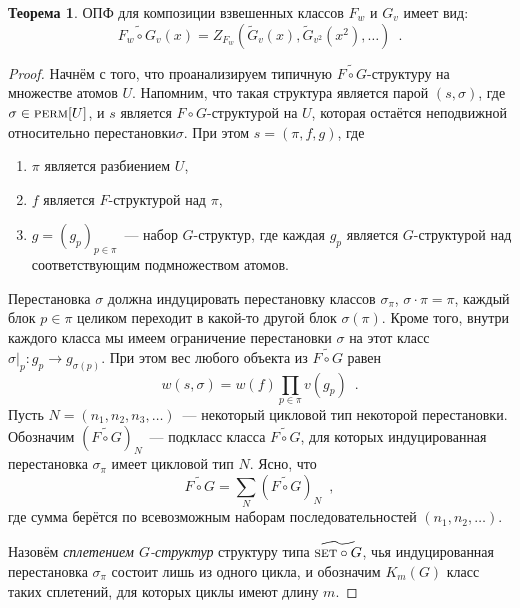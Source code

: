 \documentclass[a5paper]{article}
\theoremstyle{definition}
\newtheorem*{theorem}{Теорема}
\begin{document}
\begin{theorem}
    ОПФ для композиции взвешенных классов \( F_w \) и \( G_v \) имеет вид:
\[
    \widetilde{F_w \circ G_v}(x) = Z_{F_w}
    (\widetilde G_v(x), \widetilde G_{v^2}(x^2), \ldots)
    \enspace.
\] 
\end{theorem}
\begin{proof}
    Начнём с того, что проанализируем типичную \( \widetilde{F \circ G}
\)-структуру на множестве атомов \( U \). Напомним, что такая структура является
парой \( (s, \sigma) \), где \( \sigma \in \text{\textsc{perm}}[U] \), и \( s \)
является \( F \circ G \)-структурой на \( U \), которая остаётся неподвижной
относительно перестановки\( \sigma \). При этом \( s = ( \pi, f, g ) \), где
\begin{enumerate}
\item \( \pi \) является разбиением \( U \),
\item \( f \) является \( F \)-структурой над \( \pi \),
\item \( g= (g_p)_{p \in \pi} \)~--- набор \( G \)-структур, где каждая \( g_p
\) является \( G\)-структурой над соответствующим подмножеством атомов.
\end{enumerate}
Перестановка \( \sigma \) должна индуцировать перестановку классов \(
\sigma_\pi\), \( \sigma
\cdot \pi = \pi \), каждый блок \( p \in \pi \) целиком переходит в какой-то
другой блок \( \sigma(\pi) \). Кроме того, внутри каждого класса мы имеем
ограничение перестановки \( \sigma \) на этот класс \( \sigma |_p \colon g_p
\to g_{\sigma(p)} \). При этом вес любого объекта из \( \widetilde{F \circ G} \)
равен
\[
    w(s, \sigma) = w(f) \prod_{p \in \pi} v(g_p) \enspace .
\]
Пусть \( N = (n_1, n_2, n_3, \ldots) \)~--- некоторый цикловой тип некоторой
перестановки. Обозначим \( (\widetilde{F \circ G})_N \)~--- подкласс класса \(
\widetilde{F \circ G} \), для которых индуцированная перестановка \( \sigma_\pi
\) имеет цикловой тип \( N \).
Ясно, что
\[
    \widetilde{F \circ G} = \sum_N (\widetilde{F \circ G})_N \enspace ,
\]
где сумма берётся по всевозможным наборам последовательностей \( (n_1, n_2,
\ldots ) \).

Назовём \textit{сплетением \( G\)-структур} структуру типа \(
\widetilde{\text{\textsc{set}} \circ G} \), чья индуцированная перестановка \(
\sigma_\pi \) состоит лишь из одного цикла, и обозначим \( K_m (G) \) класс
таких сплетений, для которых циклы имеют длину \( m \).


\end{proof}
\end{document}

